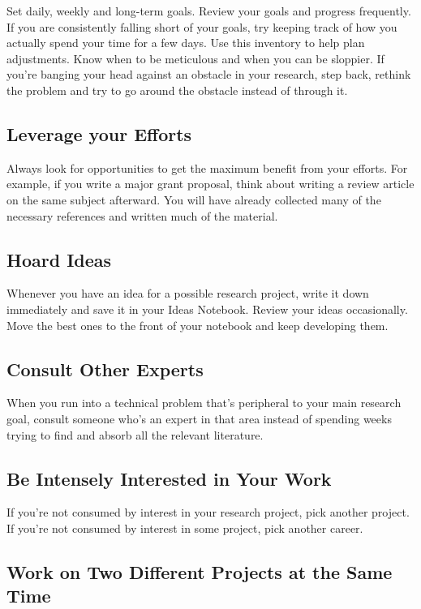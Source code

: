 \documentclass[12pt]{article}
\begin{document}
Set daily, weekly and long-term goals.
Review your goals and progress frequently.
If you are consistently falling short of your goals, try keeping track of how you actually spend your time for a few days.
Use this inventory to help plan adjustments.
Know when to be meticulous and when you can be sloppier.
If you're banging your head against an obstacle in your research, step back, rethink the problem and try to go around the obstacle instead of through it.

\subsection*{Leverage your Efforts}

Always look for opportunities to get the maximum benefit from your efforts.
For example, if you write a major grant proposal, think about writing a review article on the same subject afterward.
You will have already collected many of the necessary references and written much of the material.

\subsection*{Hoard Ideas}

Whenever you have an idea for a possible research project, write it down immediately and save it in your Ideas Notebook.
Review your ideas occasionally.
Move the best ones to the front of your notebook and keep developing them.

\subsection*{Consult Other Experts}

When you run into a technical problem that's peripheral to your main research goal, consult someone who's an expert in that area instead of spending weeks trying to find and absorb all the relevant literature.

\subsection*{Be Intensely Interested in Your Work}

If you're not consumed by interest in your research project, pick another project.
If you're not consumed by interest in some project, pick another career.

\subsection*{Work on Two Different Projects at the Same Time}
\end{document}
